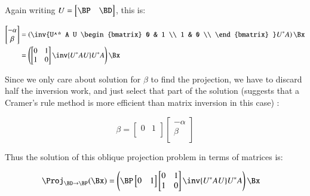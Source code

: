 Again writing $U = 
\begin{bmatrix}
\BP & \BD \\
\end{bmatrix}
$, this is:

\begin{align*}
\begin{bmatrix}
-\alpha \\
\beta \\
\end{bmatrix}
&=
\left(
\inv{U^* A U 
\begin{bmatrix}
0 & 1 \\
1 & 0 \\
\end{bmatrix}
}
U^*
A
\right)
\Bx \\
&=
\left(
\begin{bmatrix}
0 & 1 \\
1 & 0 \\
\end{bmatrix}
\inv{U^* A U 
}
U^*
A
\right)
\Bx \\
\end{align*}

Since we only care about solution for $\beta$ to find the projection, we have to discard half the inversion work, and just select
that part of the solution (suggests that a Cramer's rule method is more efficient than matrix inversion in this case) :

\[
\beta = 
\begin{bmatrix}
0 & 1 \\
\end{bmatrix}
\begin{bmatrix}
-\alpha \\
\beta \\
\end{bmatrix}
\]

Thus the solution of this oblique projection problem in terms of matrices is:

\begin{align*}
\Proj_{\BD \rightarrow \BP}(\Bx) 
&= 
\left(
\BP
\begin{bmatrix}
0 & 1 \\
\end{bmatrix}
\begin{bmatrix}
0 & 1 \\
1 & 0 \\
\end{bmatrix}
\inv{U^* A U 
}
U^*
A
\right)
\Bx
\end{align*}

